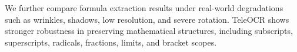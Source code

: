 \documentclass{fairmeta}
\begin{document}




We further compare formula extraction results under real-world degradations such as wrinkles, shadows, low resolution, and severe rotation. TeleOCR shows stronger robustness in preserving mathematical structures, including subscripts, superscripts, radicals, fractions, limits, and bracket scopes.


\end{document}

